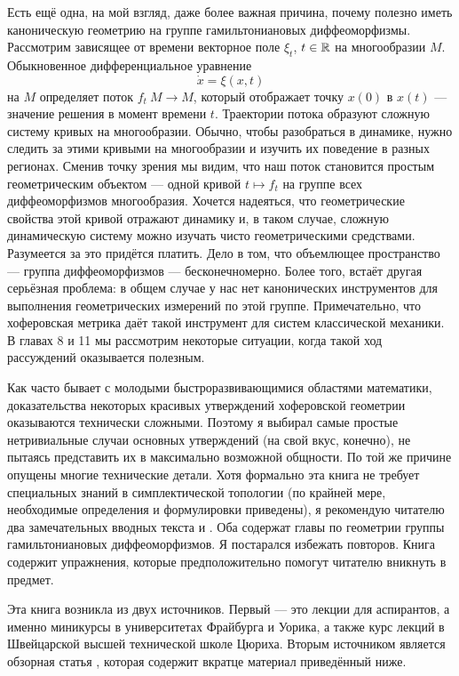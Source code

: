Есть ещё одна, на мой взгляд, даже более важная причина, почему
полезно иметь каноническую геометрию на группе гамильтониановых
диффеоморфизмы.
Рассмотрим зависящее от времени векторное поле $\xi_t$, $t\in \mathbb{R}$ на
многообразии $M$.
Обыкновенное дифференциальное уравнение
\[\dot x=\xi(x,t)\]
на $M$ определяет поток $f_t\: M \to M$, который отображает точку
$x(0)$ в $x(t)$ — значение решения в момент времени $t$. 
Траектории потока образуют сложную систему кривых на многообразии. 
Обычно, чтобы разобраться в динамике, нужно следить за этими кривыми
на многообразии и изучить их поведение в разных регионах. 
Сменив точку зрения мы видим, что наш поток становится простым
геометрическим объектом — одной кривой $t \mapsto f_t$ на группе всех диффеоморфизмов многообразия.
Хочется надеяться, что геометрические свойства этой кривой отражают
динамику и, в таком случае, сложную динамическую систему можно изучать
чисто геометрическими средствами. 
Разумеется за это придётся платить.
Дело в том, что объемлющее пространство — группа
диффеоморфизмов — бесконечномерно.
Более того, встаёт другая серьёзная проблема:
в общем случае у нас нет канонических инструментов для выполнения
геометрических измерений по этой группе.
Примечательно, что хоферовская метрика даёт такой инструмент для систем классической механики.
В главах 8 и 11 мы рассмотрим некоторые ситуации,
когда такой ход рассуждений оказывается полезным.

Как часто бывает с молодыми быстроразвивающимися областями математики, доказательства некоторых красивых утверждений хоферовской геометрии оказываются технически сложными.
Поэтому я выбирал самые простые нетривиальные случаи основных утверждений (на свой вкус, конечно), не пытаясь представить их в максимально возможной общности.
По той же причине опущены многие технические детали.
Хотя формально эта книга не требует специальных знаний в симплектической топологии (по крайней мере, необходимые определения и формулировки приведены), я рекомендую читателю  два замечательных вводных текста \cite{HZ} и \cite{MS}.
Оба содержат главы по геометрии группы гамильтониановых диффеоморфизмов.
Я постарался избежать повторов.
Книга содержит упражнения, которые предположительно помогут читателю вникнуть в предмет.

Эта книга возникла из двух источников.
Первый — это лекции для аспирантов, а именно миникурсы в университетах Фрайбурга и Уорика, а также курс лекций в Швейцарской высшей технической школе Цюриха.
Вторым источником является обзорная статья \cite{P8}, которая содержит
вкратце материал приведённый ниже.

